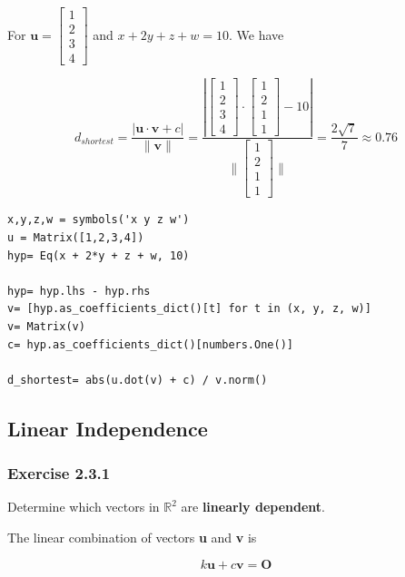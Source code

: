 For $\mathbf{u} = \left[\begin{matrix}1\\2\\3\\4\end{matrix}\right]$ and
$x + 2y + z + w = 10$. We have

$$
d_{shortest}
= \frac{|\mathbf{u} \cdot \mathbf{v} + c|}{\|\mathbf{v}\|}
= \frac{|\left[\begin{matrix}1\\2\\3\\4\end{matrix}\right] \cdot \left[\begin{matrix}1\\2\\1\\1\end{matrix}\right] - 10|}{\|\left[\begin{matrix}1\\2\\1\\1\end{matrix}\right]\|}
= \frac{2 \sqrt{7}}{7}
\approx 0.76
$$

\begin{verbatim}
x,y,z,w = symbols('x y z w')
u = Matrix([1,2,3,4])
hyp= Eq(x + 2*y + z + w, 10)

hyp= hyp.lhs - hyp.rhs
v= [hyp.as_coefficients_dict()[t] for t in (x, y, z, w)]
v= Matrix(v)
c= hyp.as_coefficients_dict()[numbers.One()]

d_shortest= abs(u.dot(v) + c) / v.norm()
\end{verbatim}

\subsection{Linear Independence}

\subsubsection{Exercise 2.3.1}

Determine which vectors in $\mathbb{R}^2$ are \textbf{linearly dependent}.

The linear combination of vectors \textbf{u} and \textbf{v} is

\begin{equation}\label{eq:ex2_3_1}
k\mathbf{u} + c\mathbf{v} = \mathbf{O}
\end{equation}

